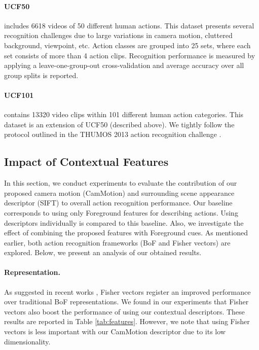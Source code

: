 \documentclass[runningheads]{llncs}
\begin{document}
\paragraph{UCF50} \cite{reddy2013} includes 6618 videos of 50 different human actions. This dataset presents several recognition challenges due to large variations in camera motion, cluttered background, viewpoint, etc. Action classes are grouped into 25 sets, where each set consists of more than 4 action clips. Recognition performance is measured by applying a leave-one-group-out cross-validation and average accuracy over all group splits is reported.

\paragraph{UCF101} \cite{soomro2012} contains 13320 video clips within 101 different human action categories. This dataset is an extension of UCF50 (described above). We tightly follow the protocol outlined in the THUMOS 2013 action recognition challenge \cite{thumos2013}. 


\subsection{Impact of Contextual Features}
In this section, we conduct experiments to evaluate the contribution of our proposed camera motion (CamMotion) and surrounding scene appearance descriptor (SIFT) to overall action recognition performance. Our baseline corresponds to using only Foreground features for describing actions. Using descriptors individually is compared to this baseline. Also, we investigate the effect of combining the proposed features with Foreground cues. As mentioned earlier, both action recognition frameworks (BoF and Fisher vectors) are explored. Below, we present an analysis of our obtained results.

\paragraph{Representation.} As suggested in recent works \cite{perronnin2010, wang2013, xwang2013}, Fisher vectors register an improved performance over traditional BoF representations. We found in our experiments that Fisher vectors also boost the performance of using our contextual descriptors. These results are reported in Table \ref{tab:features}. However, we note that using Fisher vectors is less important with our CamMotion descriptor due to its low dimensionality.
\end{document}
